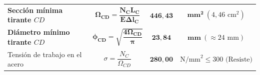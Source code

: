 \begin{table}[H]
{\begin{tabular}{lccc}
            \textbf{Sección mínima tirante $CD$}    & $\mathbf{\Omega_{CD} = \dfrac{N_C L_C}{E \Delta l_C}}$           & $\mathbf{446{,}43}$                    & $\mathbf{mm^2} \ (4{,}46\text{ cm}^2)$     \\
            \textbf{Diámetro mínimo tirante $CD$}   & $\mathbf{\phi_{CD} = \sqrt{\dfrac{4\Omega_{CD}}{\pi}}}$         & $\mathbf{23{,}84}$                     & $\mathbf{mm} \ (\approx 24\text{ mm})$     \\
            \midrule
            Tensión de trabajo en el acero          & $\sigma = \dfrac{N_C}{\Omega_{CD}}$                              & $\mathbf{280{,}00}$                    & $\text{N/mm}^2 \leq 300\text{ (Resiste)}$  \\
            \bottomrule
        \end{tabular}%
    }
    \label{tab:resumen_examen_nov_tirantes}
\end{table}



